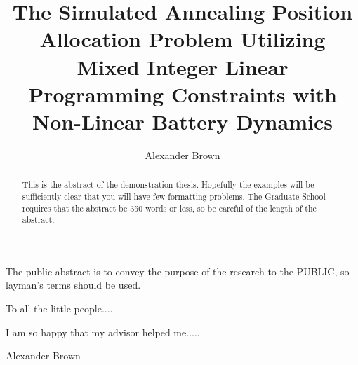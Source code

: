 \documentclass[ee,thesis]{usuthesis}
\author{Alexander Brown}
\date{}
\title{The Simulated Annealing Position Allocation Problem Utilizing Mixed Integer Linear Programming Constraints with Non-Linear Battery Dynamics}
\begin{document}
\newtheorem*{lemma}{Lemma}

\let\ref\autoref                            %

\preliminaries   %

\maketitle

\tableofcontents
\listoftables
\listoffigures

\begin{abstract}

This is the abstract of the demonstration thesis.  Hopefully the
examples will be sufficiently clear that you will have few formatting
problems. The Graduate School requires that the abstract be 350 words
or less, so be careful of the length of the abstract.

\end{abstract}

\begin{publicabstract}

The public abstract is to convey the purpose of the research to the
PUBLIC, so layman's terms should be used.


\end{publicabstract}
\begin{dedication}
\begin{center}
To all the little people....
\end{center}
%
\end{dedication}
\begin{acknowledgments}
I am so happy that my advisor helped me.....
\\
\begin{flushright}
Alexander Brown
\end{flushright}
\end{acknowledgments}

\body  %
\end{document}
